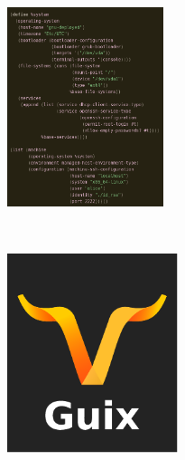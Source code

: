 \documentclass[bigger]{beamer}
\begin{document}
\begin{frame}[label={sec:org475c50c}]{⁤}
\begin{center}
\includegraphics[height=220]{./Deploy.png}
\end{center}
\end{frame}
\begin{frame}[label={sec:org7c62faf}]{⁤}
\begin{center}
\includegraphics[height=220]{./Guix Logo.pdf}
\end{center}
\end{frame}
\end{document}
